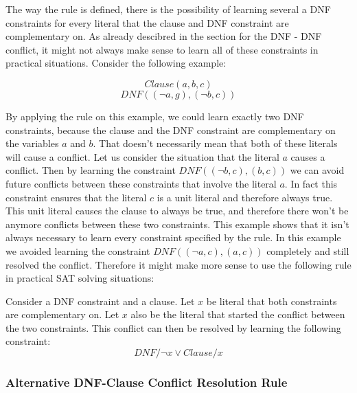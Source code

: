 The way the rule is defined, there is the possibility of learning several a DNF constraints for every literal that the clause and DNF constraint are complementary on. As already descibred in the section for the DNF - DNF conflict, it might not always make sense to learn all of these constraints in practical situations. Consider the following example:
\begin{leftbar}
\begin{displaymath}
Clause(a,b,c)
\end{displaymath}
\begin{displaymath}
DNF((\neg a,g),(\neg b, c))
\end{displaymath}
\end{leftbar}

By applying the rule on this example, we could learn exactly two DNF constraints, because the clause and the DNF constraint are complementary on the variables $a$ and $b$. That doesn't necessarily mean that both of these literals will cause a conflict. Let us consider the situation that the literal $a$ causes a conflict. Then by learning the constraint $DNF((\neg b, c),(b,c))$ we can avoid future conflicts between these constraints that involve the literal $a$. In fact this constraint ensures that the literal $c$ is a unit literal and therefore always true. This unit literal causes the clause to always be true, and therefore there won't be anymore conflicts between these two constraints. This example shows that it isn't always necessary to learn every constraint specified by the rule. In this example we avoided learning the constraint $DNF((\neg a, c),(a,c))$ completely and still resolved the conflict. Therefore it might make more sense to use the following rule in practical SAT solving situations:

\begin{leftbar}
Consider a DNF constraint and a clause. Let $x$ be literal that both constraints are complementary on. Let $x$ also be the literal that started the conflict between the two constraints. This conflict can then be resolved by learning the following constraint:
\begin{displaymath}
DNF / \neg x \vee Clause / x
\end{displaymath}
\end{leftbar}

\subsubsection{Alternative DNF-Clause Conflict Resolution Rule}


